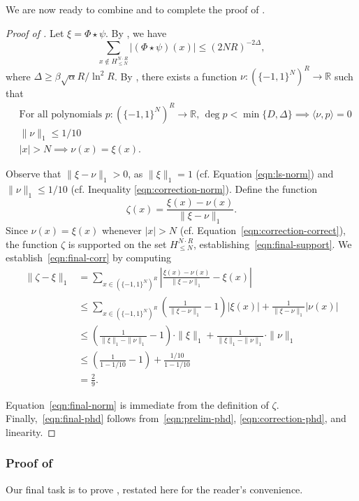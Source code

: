 \documentclass[11pt, letterpaper, fleqn]{article}
\theoremstyle{plain}
\newcommand{\R}{\mathbb{R}}
\newcommand{\bits}{\{-1,1\}}
\newcommand{\ls}{\star}
\begin{document}
We are now ready to combine  and  to complete the proof of .

\begin{proof}[Proof of ]
Let $\xi = \Phi \ls \psi$. By , we have
\[\sum_{x \notin H_{\le N}^{N \cdot R}} |(\Phi \ls \psi)(x)| \le (2 N R)^{-2\Delta},\]
where $\Delta \ge \beta \sqrt{\alpha} R /\ln^2 R$. By , there exists a function $\nu : (\bits^N)^R \to \R$ such that
\begin{align}
  &\text{For all polynomials } p \colon (\bits^N)^R  \to \R\text{, } \deg p < \min\{D, \Delta\} \implies \langle \nu, p \rangle = 0    \label{eqn:correction-phd} \\
   &\|\nu\|_1 \le 1/10     \label{eqn:correction-norm}  \\
   &|x| > N \implies \nu(x) = \xi(x).     \label{eqn:correction-correct}  
\end{align}


Observe that $\|\xi - \nu\|_1 > 0$, as
$\|\xi\|_1 = 1$ (cf. Equation \eqref{eqn:ls-norm}) and $\|\nu\|_1 \leq 1/10$ (cf. Inequality \eqref{eqn:correction-norm}).
Define the function
\[\zeta(x) = \frac{\xi(x) - \nu(x)}{\|\xi - \nu\|_1}.\]
Since $\nu(x) = \xi(x)$ whenever $|x| > N$ (cf. Equation~\eqref{eqn:correction-correct}), the function $\zeta$ is supported on the set $H_{\le N}^{N \cdot R}$, establishing~\eqref{eqn:final-support}. We establish~\eqref{eqn:final-corr} by computing
\begin{align*}
\|\zeta - \xi\|_1 &= \sum_{x \in (\bits^N)^R} \left|  \frac{\xi(x) - \nu(x)}{\|\xi - \nu\|_1} - \xi(x)\right| \\
&\le \sum_{x \in (\bits^N)^R} \left( \frac{1}{\|\xi - \nu\|_1} - 1\right)|\xi(x)| + \frac{1}{\|\xi - \nu\|_1}|\nu(x)| \\
&\le \left( \frac{1}{\|\xi\|_1 - \|\nu\|_1} - 1 \right) \cdot \|\xi\|_1 + \frac{1}{\|\xi\|_1 - \|\nu\|_1} \cdot \|\nu\|_1 \\
&\le \left(\frac{1}{1 - 1/10} - 1 \right)+ \frac{1 /10 }{1 - 1/10} \\
&= \frac{2}{9}.
\end{align*}

Equation~\eqref{eqn:final-norm} is immediate from the definition of $\zeta$. Finally,~\eqref{eqn:final-phd} follows from~\eqref{eqn:prelim-phd}, \eqref{eqn:correction-phd}, and linearity.
\end{proof}

\subsubsection{Proof of \texorpdfstring{}{Lemma \ref*{lem:combinatorial}}}
\label{s:proofofcomb}
Our final task is to prove , restated here for the reader's convenience.
\end{document}
